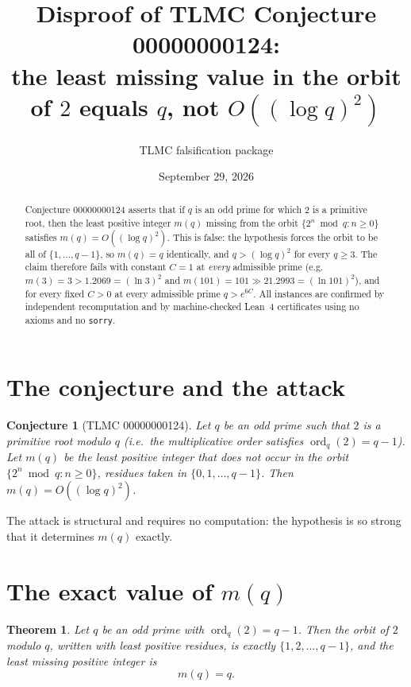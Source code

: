\documentclass[11pt]{article}
\title{Disproof of TLMC Conjecture 00000000124:\\
the least missing value in the orbit of $2$ equals $q$, not $O((\log q)^2)$}
\author{TLMC falsification package}
\date{September 29, 2026}
\newtheorem{theorem}{Theorem}
\newtheorem{conjecture}{Conjecture}
\theoremstyle{definition}
\begin{document}
\maketitle

\begin{abstract}
Conjecture 00000000124 asserts that if $q$ is an odd prime for which $2$ is a
primitive root, then the least positive integer $m(q)$ missing from the orbit
$\{2^n \bmod q : n \ge 0\}$ satisfies $m(q) = O((\log q)^2)$.  This is false:
the hypothesis forces the orbit to be all of $\{1,\dots,q-1\}$, so
$m(q) = q$ identically, and $q > (\log q)^2$ for every $q \ge 3$.  The claim
therefore fails with constant $C=1$ at \emph{every} admissible prime (e.g.\
$m(3)=3>1.2069=(\ln 3)^2$ and $m(101)=101 \gg 21.2993=(\ln 101)^2$), and for
every fixed $C>0$ at every admissible prime $q>e^{6C}$.  All instances are
confirmed by independent recomputation and by machine-checked Lean~4
certificates using no axioms and no \texttt{sorry}.
\end{abstract}

\section{The conjecture and the attack}

\begin{conjecture}[TLMC 00000000124]
Let $q$ be an odd prime such that $2$ is a primitive root modulo $q$ (i.e.\
the multiplicative order satisfies $\operatorname{ord}_q(2)=q-1$).  Let $m(q)$
be the least positive integer that does not occur in the orbit
$\{2^n \bmod q : n \ge 0\}$, residues taken in $\{0,1,\dots,q-1\}$.  Then
$m(q) = O((\log q)^2)$.
\end{conjecture}

The attack is structural and requires no computation: the hypothesis is so
strong that it determines $m(q)$ exactly.

\section{The exact value of $m(q)$}

\begin{theorem}\label{thm:main}
Let $q$ be an odd prime with $\operatorname{ord}_q(2)=q-1$.  Then the orbit of
$2$ modulo $q$, written with least positive residues, is exactly
$\{1,2,\dots,q-1\}$, and the least missing positive integer is
\[
m(q) = q .
\]
\end{theorem}
\end{document}
